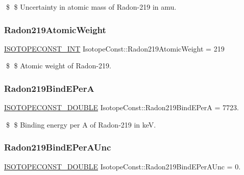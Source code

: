 \$ \$ Uncertainty in atomic mass of Radon-\/219 in amu. \mbox{\label{group___isotope_const-_radon-_rn219_gabda3e1a1ac956a52a986f06741a76aa7}} 
\subsubsection{\texorpdfstring{Radon219\+Atomic\+Weight}{Radon219AtomicWeight}}
{\footnotesize\ttfamily \mbox{\hyperlink{group___isotope_const-_macros_ga5f18360b3e99483a35c32d789e62621c}{I\+S\+O\+T\+O\+P\+E\+C\+O\+N\+S\+T\+\_\+\+I\+NT}} Isotope\+Const\+::\+Radon219\+Atomic\+Weight = 219}

\$ \$ Atomic weight of Radon-\/219. \mbox{\label{group___isotope_const-_radon-_rn219_ga052a7483cf502648ca629947e16b6d7d}} 
\subsubsection{\texorpdfstring{Radon219\+Bind\+E\+PerA}{Radon219BindEPerA}}
{\footnotesize\ttfamily \mbox{\hyperlink{group___isotope_const-_macros_ga8f45a7272ce02c0b4c65c44636ed719a}{I\+S\+O\+T\+O\+P\+E\+C\+O\+N\+S\+T\+\_\+\+D\+O\+U\+B\+LE}} Isotope\+Const\+::\+Radon219\+Bind\+E\+PerA = 7723.}

\$ \$ Binding energy per A of Radon-\/219 in keV. \mbox{\label{group___isotope_const-_radon-_rn219_gaffab1c1f299939424f376a5e10973716}} 
\subsubsection{\texorpdfstring{Radon219\+Bind\+E\+Per\+A\+Unc}{Radon219BindEPerAUnc}}
{\footnotesize\ttfamily \mbox{\hyperlink{group___isotope_const-_macros_ga8f45a7272ce02c0b4c65c44636ed719a}{I\+S\+O\+T\+O\+P\+E\+C\+O\+N\+S\+T\+\_\+\+D\+O\+U\+B\+LE}} Isotope\+Const\+::\+Radon219\+Bind\+E\+Per\+A\+Unc = 0.}

